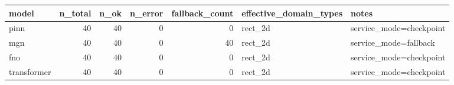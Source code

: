 \begin{tabular}{lrrrrll}
\toprule
model & n_total & n_ok & n_error & fallback_count & effective_domain_types & notes \\
\midrule
pinn & 40 & 40 & 0 & 0 & rect_2d & service_mode=checkpoint \\
mgn & 40 & 40 & 0 & 40 & rect_2d & service_mode=fallback \\
fno & 40 & 40 & 0 & 0 & rect_2d & service_mode=checkpoint \\
transformer & 40 & 40 & 0 & 0 & rect_2d & service_mode=checkpoint \\
\bottomrule
\end{tabular}
